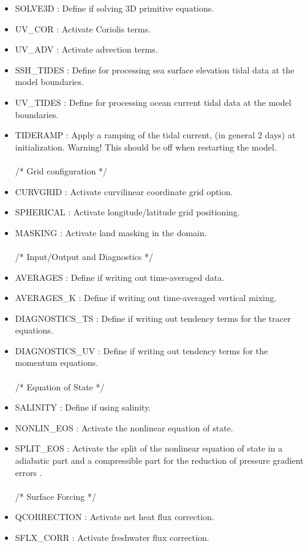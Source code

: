 \begin{itemize}
\item SOLVE3D : Define if solving 3D primitive equations.
\item UV\_COR : Activate Coriolis terms.
\item UV\_ADV : Activate advection terms.
\item SSH\_TIDES : Define for processing sea surface elevation tidal data at the model boundaries.
\item UV\_TIDES :  Define for processing ocean current tidal data at the model boundaries.
\item TIDERAMP  :  Apply a ramping of the tidal current, (in general 2 days) at initialization.
Warning! This should be off when restarting the model.
\\ \\ /*                       Grid configuration */
\item CURVGRID : Activate curvilinear coordinate grid option.
\item SPHERICAL : Activate longitude/latitude grid positioning.
\item MASKING : Activate land masking in the domain.
\\ \\ /*                       Input/Output and Diagnostics */
\item AVERAGES : Define if writing out time-averaged data.
\item AVERAGES\_K : Define if writing out time-averaged vertical mixing.
\item DIAGNOSTICS\_TS  : Define if writing out tendency terms for the tracer equations.
\item DIAGNOSTICS\_UV  : Define if writing out tendency terms for the momentum equations.
\\ \\ /*                       Equation of State */
\item SALINITY : Define if using salinity.
\item NONLIN\_EOS : Activate the nonlinear equation of state.
\item SPLIT\_EOS : Activate the split of the nonlinear equation of state in a
adiabatic part and a compressible part for the reduction of pressure gradient errors
\citep{Shc03a}.
\\ \\ /*                       Surface Forcing */
\item QCORRECTION : Activate net heat flux correction.
\item SFLX\_CORR : Activate freshwater flux correction.

\end{itemize}
